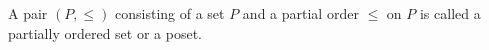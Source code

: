 A pair $(P, \leq)$ consisting of a set $P$ and a partial order $\leq$ on $P$ is called a partially ordered set or a poset.
